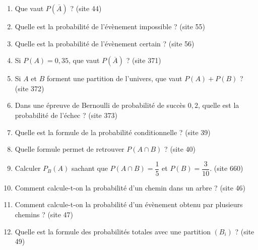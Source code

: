 \documentclass[11pt,a4paper]{article}
\newcommand{\origine}[1]{ {\scriptsize\textcolor{bleufonce}{(site #1)}}}
\newcounter{question}
\newenvironment{blocquestions}[1]{%
  \begin{tcolorbox}[
    enhanced,
    breakable,
    colback=bleuclair,
    colframe=bleufonce,
    boxrule=0.6pt,
    arc=2mm,
    left=2mm,right=2mm,top=2mm,bottom=1.5mm,
    title={\bfseries #1},
    coltitle=white,
    colbacktitle=bleufonce,
    before skip=3mm,
    after skip=3mm, fontupper=\large
  ]
  \large
  \begin{enumerate}[leftmargin=*,label=\textbf{\arabic*.},itemsep=0.45em,topsep=0.5em]
  \setcounter{enumi}{\value{question}}
}{%
  \setcounter{question}{\value{enumi}}
  \end{enumerate}
  \end{tcolorbox}
}
\begin{document}
\begin{blocquestions}{B. Premiers calculs et arbres de probabilités}
\item Que vaut \(P(\overline{A})\) ? \origine{44}
\item Quelle est la probabilité de l'évènement impossible ? \origine{55}
\item Quelle est la probabilité de l'évènement certain ? \origine{56}
\item Si \(P(A)=0{,}35\), que vaut \(P(\overline{A})\) ? \origine{371}
\item Si \(A\) et \(B\) forment une partition de l'univers, que vaut \(P(A)+P(B)\) ? \origine{372}
\item Dans une épreuve de Bernoulli de probabilité de succès \(0{,}2\), quelle est la probabilité de l'échec ? \origine{373}
\item Quelle est la formule de la probabilité conditionnelle ? \origine{39}
\item Quelle formule permet de retrouver \(P(A\cap B)\) ? \origine{40}
\item Calculer \(P_B(A)\) sachant que \(P(A\cap B)=\dfrac15\) et \(P(B)=\dfrac3{10}\). \origine{660}
\item Comment calcule-t-on la probabilité d'un chemin dans un arbre ? \origine{46}
\item Comment calcule-t-on la probabilité d'un évènement obtenu par plusieurs chemins ? \origine{47}
\item Quelle est la formule des probabilités totales avec une partition \((B_i)\) ? \origine{49}
\end{blocquestions}
\end{document}
